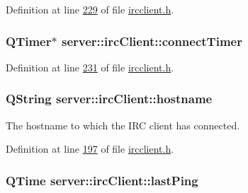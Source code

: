 Definition at line \hyperlink{ircclient_8h_source_l00229}{229} of file \hyperlink{ircclient_8h_source}{ircclient.\-h}.

\hypertarget{classserver_1_1irc_client_a3e10145fea758f4283eb8aa14f678c15}{
\subsubsection[{connect\-Timer}]{\setlength{\rightskip}{0pt plus 5cm}Q\-Timer$\ast$ server\-::irc\-Client\-::connect\-Timer\hspace{0.3cm}{\ttfamily [private]}}}\label{d1/d10/classserver_1_1irc_client_a3e10145fea758f4283eb8aa14f678c15}


Definition at line \hyperlink{ircclient_8h_source_l00231}{231} of file \hyperlink{ircclient_8h_source}{ircclient.\-h}.

\hypertarget{classserver_1_1irc_client_a8a5a50ebf84488f46df38bfba2c692bd}{
\subsubsection[{hostname}]{\setlength{\rightskip}{0pt plus 5cm}Q\-String server\-::irc\-Client\-::hostname\hspace{0.3cm}{\ttfamily [private]}}}\label{d1/d10/classserver_1_1irc_client_a8a5a50ebf84488f46df38bfba2c692bd}


The hostname to which the I\-R\-C client has connected. 



Definition at line \hyperlink{ircclient_8h_source_l00197}{197} of file \hyperlink{ircclient_8h_source}{ircclient.\-h}.

\hypertarget{classserver_1_1irc_client_a522f1dcf5381da46bc18609b69ac6287}{
\subsubsection[{last\-Ping}]{\setlength{\rightskip}{0pt plus 5cm}Q\-Time server\-::irc\-Client\-::last\-Ping\hspace{0.3cm}{\ttfamily [private]}}}\label{d1/d10/classserver_1_1irc_client_a522f1dcf5381da46bc18609b69ac6287}



